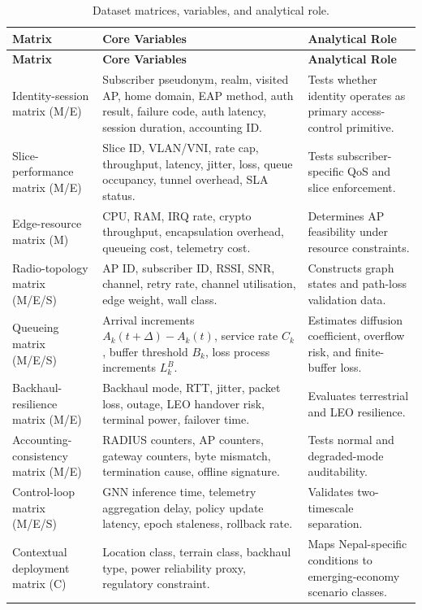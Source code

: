 \begin{longtable}{p{3.0cm}p{5.2cm}p{5.0cm}}
  \caption{Dataset matrices, variables, and analytical role.}\label{tab:dataset}\\
  \toprule
  \textbf{Matrix} & \textbf{Core Variables} & \textbf{Analytical Role} \\
  \midrule
  \endfirsthead
  \toprule
  \textbf{Matrix} & \textbf{Core Variables} & \textbf{Analytical Role} \\
  \midrule
  \endhead
  Identity-session matrix (M/E) & Subscriber pseudonym, realm, visited AP, home domain, EAP method, auth result, failure code, auth latency, session duration, accounting ID. & Tests whether identity operates as primary access-control primitive. \\
  Slice-performance matrix (M/E) & Slice ID, VLAN/VNI, rate cap, throughput, latency, jitter, loss, queue occupancy, tunnel overhead, SLA status. & Tests subscriber-specific QoS and slice enforcement. \\
  Edge-resource matrix (M) & CPU, RAM, IRQ rate, crypto throughput, encapsulation overhead, queueing cost, telemetry cost. & Determines AP feasibility under resource constraints. \\
  Radio-topology matrix (M/E/S) & AP ID, subscriber ID, RSSI, SNR, channel, retry rate, channel utilisation, edge weight, wall class. & Constructs graph states and path-loss validation data. \\
  Queueing matrix (M/E/S) & Arrival increments $A_k(t+\Delta)-A_k(t)$, service rate $C_k$, buffer threshold $B_k$, loss process increments $L_k^B$. & Estimates diffusion coefficient, overflow risk, and finite-buffer loss. \\
  Backhaul-resilience matrix (M/E) & Backhaul mode, RTT, jitter, packet loss, outage, LEO handover risk, terminal power, failover time. & Evaluates terrestrial and LEO resilience. \\
  Accounting-consistency matrix (M/E) & RADIUS counters, AP counters, gateway counters, byte mismatch, termination cause, offline signature. & Tests normal and degraded-mode auditability. \\
  Control-loop matrix (M/E/S) & GNN inference time, telemetry aggregation delay, policy update latency, epoch staleness, rollback rate. & Validates two-timescale separation. \\
  Contextual deployment matrix (C) & Location class, terrain class, backhaul type, power reliability proxy, regulatory constraint. & Maps Nepal-specific conditions to emerging-economy scenario classes. \\
  \bottomrule
\end{longtable}

